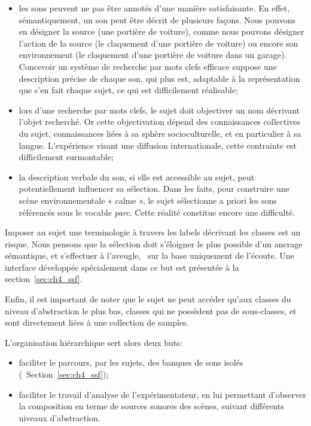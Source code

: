 \begin{itemize}
\item les sons peuvent ne pas être annotés d'une manière satisfaisante. En effet, sémantiquement, un son peut être décrit de plusieurs façons. Nous pouvons en désigner la source (une portière de voiture), comme nous pouvons désigner l'action de la source (le claquement d’une portière de voiture) ou encore son environnement (le claquement d’une portière de voiture dans un garage). Concevoir un système de recherche par mots clefs efficace suppose une description précise de chaque son, qui plus est, adaptable à la représentation que s’en fait chaque sujet, ce qui est difficilement réalisable;

\item lors d'une recherche par mots clefs, le sujet doit objectiver un nom décrivant l'objet recherché. Or cette objectivation dépend des connaissances collectives du sujet, connaissances liées à sa sphère socioculturelle, et en particulier à sa langue. L'expérience visant une diffusion internationale, cette contrainte est difficilement surmontable;

\item la description verbale du son, si elle est accessible au sujet, peut potentiellement influencer sa sélection. Dans les faits, pour construire une scène environnementale « calme », le sujet sélectionne a priori les sons référencés sous le vocable \emph{parc}. Cette réalité constitue encore une difficulté.
\end{itemize}

Imposer au sujet une terminologie à travers les labels décrivant les classes est un risque. Nous pensons que la sélection doit s'éloigner le plus possible d'un ancrage sémantique, et s'effectuer à l'aveugle, \ie~sur la base uniquement de l'écoute. Une interface développée spécialement dans ce but est présentée à la section~\ref{sec:ch4_ssf}.

Enfin, il est important de noter que le sujet ne peut accéder qu'aux classes du niveau d'abstraction le plus bas, classes qui ne possèdent pas de sous-classes, et sont directement liées à une collection de samples.

L’organisation hiérarchique sert alors deux buts:

\begin{itemize}
\item faciliter le parcours, par les sujets, des banques de sons isolés (\cf~Section~\ref{sec:ch4_ssf});
\item faciliter le travail d'analyse de l'expérimentateur, en lui permettant d'observer la composition en terme de sources sonores des scènes, suivant différents niveaux d'abstraction.
\end{itemize}

